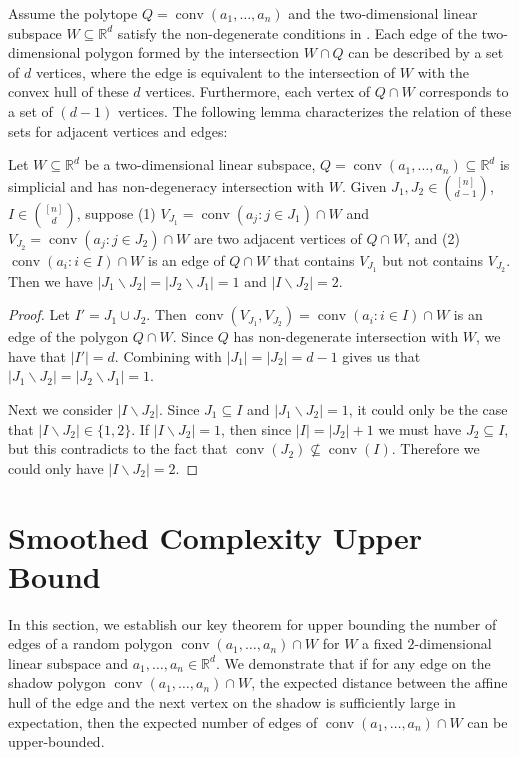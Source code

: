 \documentclass{article}\usepackage[a4paper,margin=20mm]{geometry}
\newcommand{\R}{\mathbb R}
\newcommand{\conv}{\operatorname{conv}}
\renewcommand{\subset}{\subseteq}
\begin{document}
Assume the polytope $Q = \conv(a_1,\dots,a_n)$ and the two-dimensional linear subspace $W \subset \R^d$ satisfy the non-degenerate conditions in .
Each edge of the two-dimensional polygon formed by the intersection $W \cap Q$ can be described by a set of $d$ vertices, where the edge is equivalent to the intersection of $W$ with the convex hull of these $d$ vertices. Furthermore, each vertex of $Q \cap W$ corresponds to a set of $(d-1)$ vertices. The following lemma characterizes the relation of these sets for adjacent vertices and edges:


\begin{fact}\label{fact:diff-adjacent-vertex}
    Let $W \subset \R^d$ be a two-dimensional linear subspace, $Q = \conv(a_1,\dots,a_n) \subset \R^d$ is simplicial and has non-degeneracy intersection with $W$. 
    Given $J_1, J_2 \in \binom{[n]}{d-1}$, $I \in \binom{[n]}{d}$, suppose
    (1) $V_{J_1} = \conv(a_j : j\in J_1) \cap W$ and $V_{J_2} = \conv(a_j : j\in J_2) \cap W$ are two adjacent vertices of $Q \cap W$, and (2) $\conv(a_i : i\in I) \cap W$ is an edge of $Q \cap W$ that contains $V_{J_1}$ but not contains $V_{J_2}$.
    Then we have $|J_1 \backslash J_2| = |J_2 \backslash J_1| = 1$ and $|I \backslash J_2| = 2$.
\end{fact}
\begin{proof}
    Let $I' = J_1 \cup J_2$. Then $\conv(V_{J_1}, V_{J_2}) = \conv(a_i : i\in I) \cap W$ is an edge of the polygon $Q \cap W$. Since $Q$ has non-degenerate intersection with $W$, we have that $|I'| = d$. Combining with $|J_1| = |J_2| = d-1$ gives us that $|J_1 \backslash J_2| = |J_2 \backslash J_1| = 1$.
    
    Next we consider $|I \backslash J_2|$. Since $J_1 \subset I$ and $|J_1 \backslash J_2| = 1$, it could only be the case that $|I \backslash J_2| \in \{1, 2\}$. If  $|I \backslash J_2| = 1$, then since $|I| = |J_2|+1$ we must have $J_2 \subset I$, but this contradicts to the fact that $\conv(J_2) \not\subset \conv(I)$. Therefore we could only have $|I \backslash J_2| = 2$.
\end{proof}


\section{Smoothed Complexity Upper Bound}\label{sec:ub-general}

In this section, we establish our key theorem for upper bounding the number of edges
of a random polygon $\conv(a_1,\dots,a_n) \cap W$ for $W$ a fixed $2$-dimensional
linear subspace and $a_1,\dots,a_n \in \R^d$. 
We demonstrate that if 
for any edge on the shadow polygon $\conv(a_1, \ldots, a_n) \cap W$, 
the expected distance between the affine hull of the edge and the next vertex
on the shadow is sufficiently large in expectation, then the expected number
of edges of $\conv(a_1, \ldots, a_n) \cap W$ can be upper-bounded.
\end{document}
